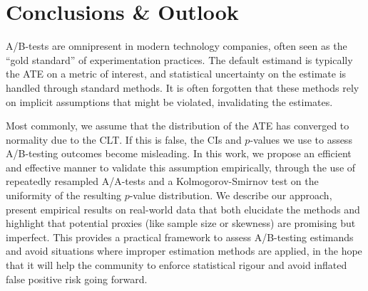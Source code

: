 \section{Conclusions \& Outlook}
A/B-tests are omnipresent in modern technology companies, often seen as the ``gold standard'' of experimentation practices.
The default estimand is typically the ATE on a metric of interest, and statistical uncertainty on the estimate is handled through standard methods. 
It is often forgotten that these methods rely on implicit assumptions that might be violated, invalidating the estimates.

Most commonly, we assume that the distribution of the ATE has converged to normality due to the CLT. 
If this is false, the CIs and $p$-values we use to assess A/B-testing outcomes become misleading.
In this work, we propose an efficient and effective manner to validate this assumption empirically, through the use of repeatedly resampled A/A-tests and a Kolmogorov-Smirnov test on the uniformity of the resulting $p$-value distribution.
We describe our approach, present empirical results on real-world data that both elucidate the methods and highlight that potential proxies (like sample size or skewness) are promising but imperfect.
This provides a practical framework to assess A/B-testing estimands and avoid situations where improper estimation methods are applied, in the hope that it will help the community to enforce statistical rigour and avoid inflated false positive risk going forward.
